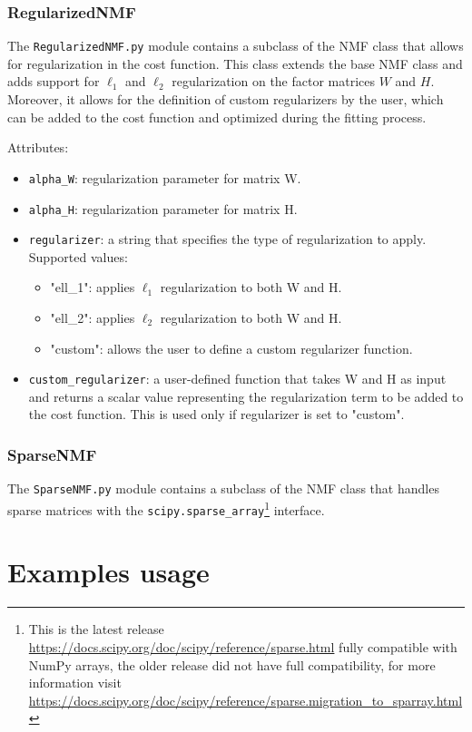 \subsubsection{RegularizedNMF}
The \texttt{RegularizedNMF.py} module contains a subclass of the NMF class that allows for regularization in the cost function. This class extends the base NMF class and adds support for $\ell_1$ and $\ell_2$ regularization on the factor matrices $W$ and $H$.
Moreover, it allows for the definition of custom regularizers by the user, which can be added to the cost function and optimized during the fitting process.
\par
Attributes:
\begin{itemize}
    \item \texttt{alpha\_W}: regularization parameter for matrix W.
    \item \texttt{alpha\_H}: regularization parameter for matrix H.
    \item \texttt{regularizer}: a string that specifies the type of regularization to apply. Supported values:
    \begin{itemize}   
        \item "ell\_1": applies $\ell_1$ regularization to both W and H.
        \item "ell\_2": applies $\ell_2$ regularization to both W and H.
        \item "custom": allows the user to define a custom regularizer function.
    \end{itemize}
    \item \texttt{custom\_regularizer}: a user-defined function that takes W and H as input and returns a scalar value representing the regularization term to be added to the cost function. This is used only if regularizer is set to "custom".
\end{itemize}
\subsubsection{SparseNMF}
The \texttt{SparseNMF.py} module contains a subclass of the NMF class that handles sparse matrices with the \texttt{scipy.sparse\_array}\footnote{This is the latest release \url{https://docs.scipy.org/doc/scipy/reference/sparse.html} fully compatible with NumPy arrays, 
the older release did not have full compatibility, for more information visit \url{https://docs.scipy.org/doc/scipy/reference/sparse.migration_to_sparray.html}} interface.
\section{Examples usage}
